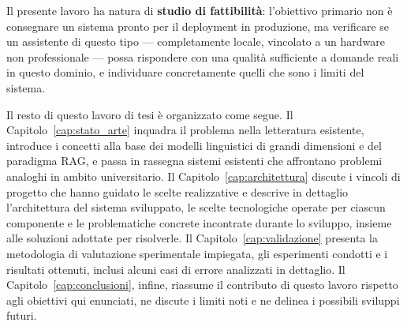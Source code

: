 Il presente lavoro ha natura di \textbf{studio di fattibilità}: l'obiettivo primario non è consegnare un sistema
pronto per il deployment in produzione, ma verificare se un assistente di questo tipo --- completamente locale,
vincolato a un hardware non professionale --- possa rispondere con una qualità sufficiente a domande reali in questo
dominio, e individuare concretamente quelli che sono i limiti del sistema.

Il resto di questo lavoro di tesi è organizzato come segue. Il Capitolo~\ref{cap:stato_arte} inquadra il problema
nella letteratura esistente, introduce i concetti alla base dei modelli linguistici di grandi dimensioni e del
paradigma RAG, e passa in rassegna sistemi esistenti che affrontano problemi analoghi in ambito universitario. Il
Capitolo~\ref{cap:architettura} discute i vincoli di progetto che hanno guidato le scelte realizzative e descrive in
dettaglio l'architettura del sistema sviluppato, le scelte tecnologiche operate per ciascun componente e le
problematiche concrete incontrate durante lo sviluppo, insieme alle soluzioni adottate per risolverle. Il
Capitolo~\ref{cap:validazione} presenta la metodologia di valutazione sperimentale impiegata, gli esperimenti
condotti e i risultati ottenuti, inclusi alcuni casi di errore analizzati in dettaglio. Il
Capitolo~\ref{cap:conclusioni}, infine, riassume il contributo di questo lavoro rispetto agli obiettivi qui
enunciati, ne discute i limiti noti e ne delinea i possibili sviluppi futuri.

